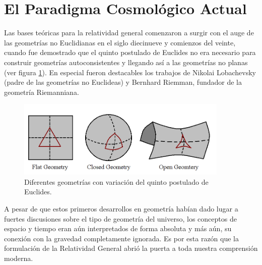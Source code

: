 



\section{El Paradigma Cosmológico Actual}
\label{sec:TheCurrentCosmologyPicture}


Las bases teóricas para la relatividad general comenzaron a surgir con el 
auge de las geometrías no Euclidianas en el siglo diecinueve y comienzos 
del veinte, cuando fue demostrado que el quinto postulado de Euclides no 
era necesario para construir geometrías autoconsistentes y llegando así a 
las geometrías no planas (ver figura \ref{fig:NonEuclidean}). En especial 
fueron destacables los trabajos de Nikolai Lobachevsky (padre de las 
geometrías no Euclideas) y Bernhard Riemman, fundador de la geometría 
Riemanniana.


\begin{figure}[htbp]
	\centering
	\includegraphics[width=0.9\textwidth]
	{./figures/1_introduction/Non_Euclidean.png}
	
	\caption{\small{Diferentes geometrías con variación del quinto postulado 
	de Euclides.}}
	
	\label{fig:NonEuclidean}
\end{figure}


A pesar de que estos primeros desarrollos en geometría habían dado lugar a
fuertes discusiones sobre el tipo de geometría del universo, los conceptos 
de espacio y tiempo eran aún interpretados de forma absoluta y más aún, su 
conexión con la gravedad completamente ignorada. Es por esta razón que 
la formulación de la Relatividad General abrió la puerta a toda nuestra
comprensión moderna.


